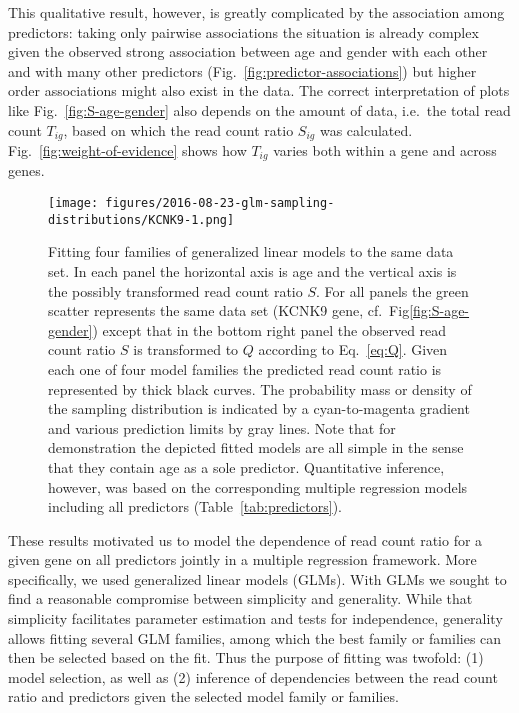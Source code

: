 \documentclass[letterpaper]{article}
\begin{document}
This qualitative result, however, is greatly complicated by the association
among predictors: taking only pairwise associations the situation is already
complex given the observed strong association between age and gender with each
other and with many other predictors (Fig.~\ref{fig:predictor-associations})
but higher order associations might also exist in the data.
The correct interpretation of plots like Fig.~\ref{fig:S-age-gender} also depends on
the amount of data, i.e.~the total read count \(T_{ig}\), based on which the
read count ratio \(S_{ig}\) was calculated.  Fig.~\ref{fig:weight-of-evidence}
shows how \(T_{ig}\) varies both within a gene and across genes.

\begin{figure}
\begin{center}
\texttt{[image: figures/2016-08-23-glm-sampling-distributions/KCNK9-1.png]}
\end{center}
\caption{Fitting four families of generalized linear models to the same data
set.  In each panel the horizontal axis is age and the vertical axis is the
possibly transformed read count ratio \(S\).  For all panels the green scatter
represents the same data set (KCNK9 gene, cf.~Fig\ref{fig:S-age-gender})
except that in the bottom right panel the observed read count ratio \(S\) is
transformed to \(Q\) according to Eq.~\ref{eq:Q}.  Given each one of four model
families the predicted read count ratio is represented by thick black curves.
The probability mass or density of the sampling distribution is indicated by a
cyan-to-magenta gradient and various prediction limits by gray lines.  Note
that for demonstration the depicted fitted models are all simple in the sense
that they contain age as a sole predictor.  Quantitative inference, however,
was based on the corresponding multiple regression models including all
predictors (Table~\ref{tab:predictors}).
  }
\label{fig:predicted-curves}
\end{figure}

These results motivated us to model the dependence of read count ratio for a
given gene on all predictors jointly in a multiple regression framework.  More
specifically, we used generalized linear models (GLMs).  With GLMs we sought
to find a reasonable compromise between simplicity and generality.  While that
simplicity facilitates parameter estimation and tests for independence,
generality allows fitting several GLM families, among which the best family or
families can then be selected based on the fit.  Thus the purpose of fitting
was twofold: (1) model selection, as well as (2) inference of dependencies
between the read count ratio and predictors given the selected model family or
families.
\end{document}
